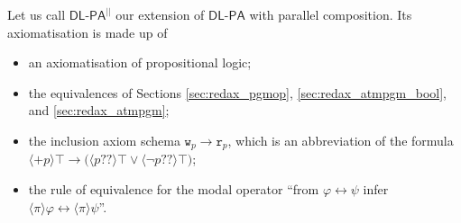 \documentclass{llncs}
\newcommand{\pll}{ {||} }							%
\newcommand{\readable}[1]{\mathtt{r}_{#1}}
\newcommand{\writable}[1]{\mathtt{w}_{#1}}
\newcommand{\testendo}{?\!\!?}			%
\newcommand{\Dlpa}{\ensuremath{\mathsf{DL\text{-}PA}}\xspace}
\newcommand{\DlpaPll}{\ensuremath{\mathsf{DL\text{-}PA}^\pll}\xspace}
\newcommand{\assgntopV}[1]{{\mathtt {+} #1}}
\newcommand{\assgnbotV}[1]{{\mathtt {-} #1}}
\newcommand{\ldia}[1]{ \big\langle #1 \big\rangle}
\newcommand{\leqv}{ \leftrightarrow }
\newcommand{\limp}{ \rightarrow }
\renewcommand{\phi}{\varphi}
\begin{document}
Let us call \DlpaPll our extension of \Dlpa with parallel composition. 
Its axiomatisation is made up of 
\begin{itemize}
\item
an axiomatisation of propositional logic;
\item
the equivalences of Sections \ref{sec:redax_pgmop}, 
\ref{sec:redax_atmpgm_bool}, 
and \ref{sec:redax_atmpgm};
\item
the inclusion axiom schema $\writable{p} \limp \readable p$, which is an abbreviation of the formula
$\ldia{ \assgntopV p } \top \limp \big( \ldia{ p \testendo} \top \lor \ldia{ \lnot p \testendo} \top \big) $;
\item
the rule of equivalence for the modal operator %
``from $\phi \leqv \psi$ infer $\ldia \pi \phi \leqv \ldia \pi \psi $''.
\end{itemize}
\end{document}
